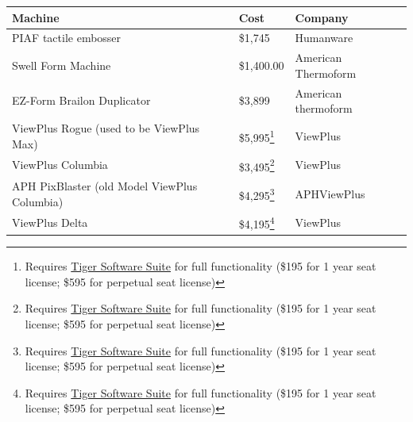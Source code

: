 \documentclass[14pt, letterpaper,twoside]{extreport}
\begin{document}
\begin{longtable}[]{@{}
    >{\raggedright\arraybackslash}p{}
    >{\raggedright\arraybackslash}p{}
    >{\raggedright\arraybackslash}p{}@{}
    }
    \textbf{Machine}                                    & \textbf{Cost}                                                                                                                                                                                         & \textbf{Company}    \\
    \midrule\noalign{}
    \endhead
    \bottomrule\noalign{}
    \endlastfoot
    PIAF tactile embosser                               & \$1,745                                                                                                                                                                                               & Humanware           \\[1.0em]
    Swell Form Machine                                  & \$1,400.00                                                                                                                                                                                            & American Thermoform \\[1.0em]
    EZ-Form Brailon Duplicator                          & \$3,899                                                                                                                                                                                               & American thermoform \\[1.0em]
    ViewPlus Rogue \break (used to be ViewPlus Max)     & \$5,995\footnote{Requires \href{https://viewplus.com/product/tiger-software-suite8/}{Tiger Software Suite} for full functionality (\$195 for 1 year seat license; \$595 for perpetual seat license)}  & ViewPlus            \\[1.0em]
    ViewPlus Columbia                                   & \$3,495\footnote{Requires \href{https://viewplus.com/product/tiger-software-suite8/}{Tiger Software Suite} for full functionality (\$195 for 1 year seat license; \$595 for perpetual seat license)}  & ViewPlus            \\[1.0em]
    APH PixBlaster \break (old Model ViewPlus Columbia) & \$4,295\footnote{Requires \href{https://viewplus.com/product/tiger-software-suite8/}{Tiger Software Suite} for full functionality (\$195 for 1 year seat license; \$595 for perpetual seat license)}  & APH\break ViewPlus  \\[1.0em]
    ViewPlus Delta                                      & \$4,195\footnote{Requires \href{https://viewplus.com/product/tiger-software-suite8/}{Tiger Software Suite} for full functionality (\$195 for 1 year seat license; \$595 for perpetual seat license)}  & ViewPlus            \\[1.0em]

\end{longtable}
\end{document}
